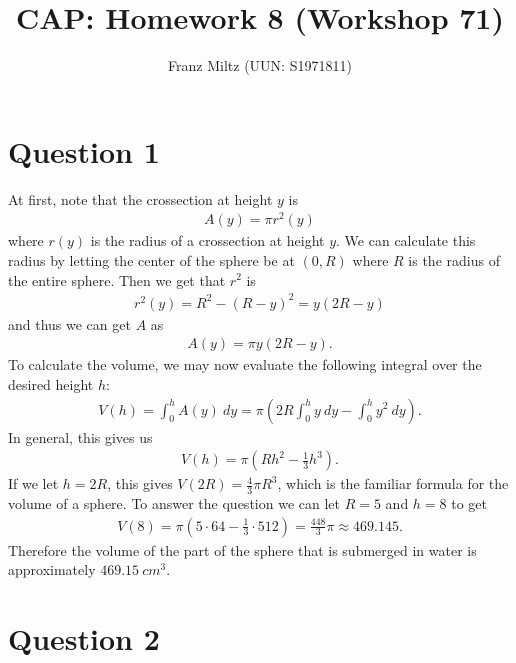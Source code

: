 \documentclass{article}
\title{CAP: Homework 8 (Workshop 71)}
\author{Franz Miltz (UUN: S1971811)}
\begin{document}
\maketitle
\section*{Question 1}
At first, note that the crossection at height $y$ is
\begin{align*}
	A(y) = \pi r^2(y)
\end{align*}
where $r(y)$ is the radius of a crossection at height $y$.
We can calculate this radius by letting the center of the sphere be at $(0, R)$ where $R$ is the radius of the entire sphere.
Then we get that $r^2$ is
\begin{align*}
	r^2(y) = R^2-(R-y)^2 = y(2R-y)
\end{align*}
and thus we can get $A$ as
\begin{align*}
	A(y) = \pi y(2R-y).
\end{align*}
To calculate the volume, we may now evaluate the following integral over the desired height $h$:
\begin{align*}
	V(h)=\int_0^h A(y)\:dy=\pi\left(2R\int_0^h y\:dy - \int_0^h y^2\:dy\right).
\end{align*}
In general, this gives us
\begin{align*}
	V(h)=\pi(Rh^2-\frac{1}{3}h^3).
\end{align*}
If we let $h=2R$, this gives $V(2R)=\frac{4}{3}\pi R^3$, which is the familiar formula for the volume of a sphere.
To answer the question we can let $R=5$ and $h=8$ to get
\begin{align*}
	V(8)=\pi(5\cdot 64-\frac{1}{3}\cdot 512) = \frac{448}{3}\pi\approx 469.145.
\end{align*}
Therefore the volume of the part of the sphere that is submerged in water is approximately $469.15\:cm^3$.
\section*{Question 2}
\end{document}
